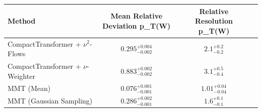     \begin{tabular}{lccc}
        \toprule
        Method & Mean Relative Deviation p_{T}(W) & Relative Resolution p_{T}(W) \\
        \midrule
        CompactTransformer + $\nu^2$-Flows & $0.295_{-0.002}^{+0.004}$ & $2.1_{-0.2}^{+0.2}$ \\
        CompactTransformer + $\nu$-Weighter & $0.883_{-0.002}^{+0.002}$ & $3.1_{-0.4}^{+0.5}$ \\
        MMT (Mean) & $0.076_{-0.001}^{+0.001}$ & $1.01_{-0.04}^{+0.04}$ \\
        MMT (Gaussian Sampling) & $0.286_{-0.001}^{+0.002}$ & $1.6_{-0.1}^{+0.1}$ \\
        \bottomrule
    \end{tabular}
